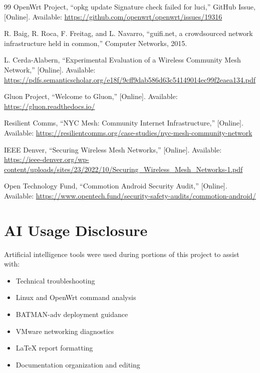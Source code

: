 \documentclass[conference]{IEEEtran}
\begin{document}
\begin{thebibliography}{99}
OpenWrt Project, ``opkg update Signature check failed for luci,'' GitHub Issue, [Online]. Available: \url{https://github.com/openwrt/openwrt/issues/19316}

R. Baig, R. Roca, F. Freitag, and L. Navarro, ``guifi.net, a crowdsourced network infrastructure held in common,'' Computer Networks, 2015.

L. Cerda-Alabern, ``Experimental Evaluation of a Wireless Community Mesh Network,'' [Online]. Available: \url{https://pdfs.semanticscholar.org/e18f/9cff9dab586d63c54149014ec99f2eaea134.pdf}

Gluon Project, ``Welcome to Gluon,'' [Online]. Available: \url{https://gluon.readthedocs.io/}

Resilient Comms, ``NYC Mesh: Community Internet Infrastructure,'' [Online]. Available: \url{https://resilientcomms.org/case-studies/nyc-mesh-community-network}

IEEE Denver, ``Securing Wireless Mesh Networks,'' [Online]. Available: \url{https://ieee-denver.org/wp-content/uploads/sites/23/2022/10/Securing_Wireless_Mesh_Networks-1.pdf}

Open Technology Fund, ``Commotion Android Security Audit,'' [Online]. Available: \url{https://www.opentech.fund/security-safety-audits/commotion-android/}

\end{thebibliography}

\section*{AI Usage Disclosure}

Artificial intelligence tools were used during portions of this project to assist with:

\begin{itemize}
    \item Technical troubleshooting
    \item Linux and OpenWrt command analysis
    \item BATMAN-adv deployment guidance
    \item VMware networking diagnostics
    \item LaTeX report formatting
    \item Documentation organization and editing
\end{itemize}
\end{document}
